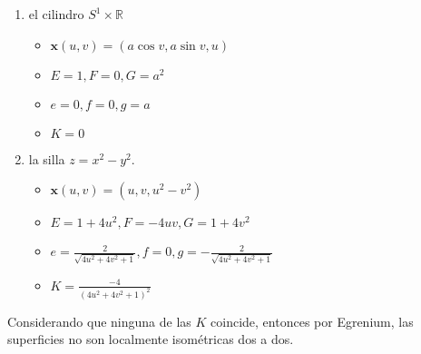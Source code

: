 \begin{problema}
\begin{sol}
\begin{enumerate}
            \item el cilindro $S^1 \times \mathbb{R}$
            \begin{itemize}
                \item $\mathbf{x}(u,v)=(a\cos v, a\sin v,u)$
                \item $E=1, F=0,G=a^2$
                \item $e=0,f=0,g=a$
                \item $K=0$ 
            \end{itemize}
            \item la silla $z=x^2-y^2$.
            \begin{itemize}
                \item $\mathbf{x}(u,v)=(u,v,u^2-v^2)$
                \item $E=1+4u^2, F=-4uv,G=1+4v^2$
                \item $e=\frac{2}{\sqrt{4u^2+4v^2+1}},f=0,g=-\frac{2}{\sqrt{4u^2+4v^2+1}}$
                \item $K=\frac{-4}{(4u^2+4v^2+1)^2}$ 
            \end{itemize}
        \end{enumerate}
        Considerando que ninguna de las $K$ coincide, entonces por Egrenium, las superficies no son localmente isométricas dos a dos. 
    \end{sol}
\end{problema}
